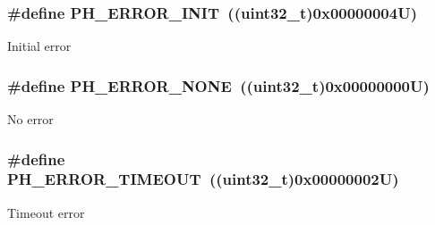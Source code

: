 \subsubsection[{\texorpdfstring{P\+H\+\_\+\+E\+R\+R\+O\+R\+\_\+\+I\+N\+IT}{PH_ERROR_INIT}}]{\setlength{\rightskip}{0pt plus 5cm}\#define P\+H\+\_\+\+E\+R\+R\+O\+R\+\_\+\+I\+N\+IT~((uint32\+\_\+t)0x00000004\+U)}\hypertarget{group___p_h___error___code_ga15fbdf4edfc98283ef0f1b7c2fc0a47b}{}\label{group___p_h___error___code_ga15fbdf4edfc98283ef0f1b7c2fc0a47b}
Initial error 
\subsubsection[{\texorpdfstring{P\+H\+\_\+\+E\+R\+R\+O\+R\+\_\+\+N\+O\+NE}{PH_ERROR_NONE}}]{\setlength{\rightskip}{0pt plus 5cm}\#define P\+H\+\_\+\+E\+R\+R\+O\+R\+\_\+\+N\+O\+NE~((uint32\+\_\+t)0x00000000\+U)}\hypertarget{group___p_h___error___code_ga67055c114ec03135c28e1cb6a3d68f5a}{}\label{group___p_h___error___code_ga67055c114ec03135c28e1cb6a3d68f5a}
No error 
\subsubsection[{\texorpdfstring{P\+H\+\_\+\+E\+R\+R\+O\+R\+\_\+\+T\+I\+M\+E\+O\+UT}{PH_ERROR_TIMEOUT}}]{\setlength{\rightskip}{0pt plus 5cm}\#define P\+H\+\_\+\+E\+R\+R\+O\+R\+\_\+\+T\+I\+M\+E\+O\+UT~((uint32\+\_\+t)0x00000002\+U)}\hypertarget{group___p_h___error___code_gaae8d2172a18fdde6957c77af378c2574}{}\label{group___p_h___error___code_gaae8d2172a18fdde6957c77af378c2574}
Timeout error 